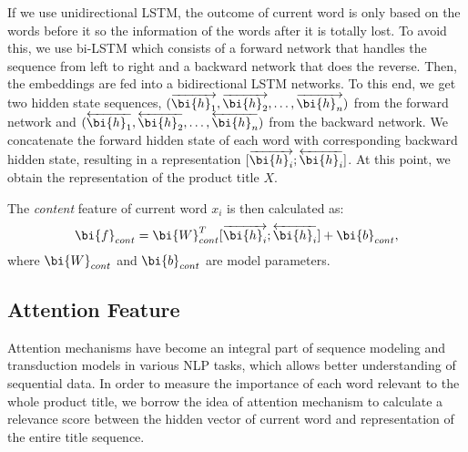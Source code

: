 If we use unidirectional LSTM, the outcome of current word is only based on the words before it so the information of the words after it is totally lost. 
To avoid this, we use bi-LSTM which consists of a forward network that handles 
the sequence from left to right and a backward network that does the reverse.
Then, the embeddings are fed into a bidirectional LSTM networks.
To this end, we get two hidden state sequences, $(\overrightarrow{\bi{h}_1}, \overrightarrow{\bi{h}_2}, \dots, \overrightarrow{\bi{h}_n})$ from the forward network and $(\overleftarrow{\bi{h}_1}, \overleftarrow{\bi{h}_2}, \dots, \overleftarrow{\bi{h}_n})$ from the
backward network. 
We concatenate the forward hidden state of each word with corresponding backward hidden state, 
resulting in a representation $[\overrightarrow{\bi{h}_i};\overleftarrow{\bi{h}_i}]$. 
At this point, we obtain the representation of the product title $X$.

The \textit{content} feature of current word $x_i$ is then calculated as:
\begin{equation}
\label{eqn:content}
\bi{f}_{cont} = \bi{W}_{cont}^T [\overrightarrow{\bi{h}_i};\overleftarrow{\bi{h}_i}] + \bi{b}_{cont},
\end{equation}
where $\bi{W}_{cont}$ and $\bi{b}_{cont}$ are model parameters.




\subsection{Attention Feature}

Attention mechanisms \cite{bahdanau2014neural,luong2015effective} have become an integral part of sequence modeling and transduction models in various NLP tasks, which allows better understanding of sequential data.
In order to measure the importance of each word relevant to the whole product title, we borrow the idea of attention mechanism \cite{bahdanau2014neural,luong2015effective} to calculate a relevance score between the hidden vector of current word and representation of the entire title sequence.

